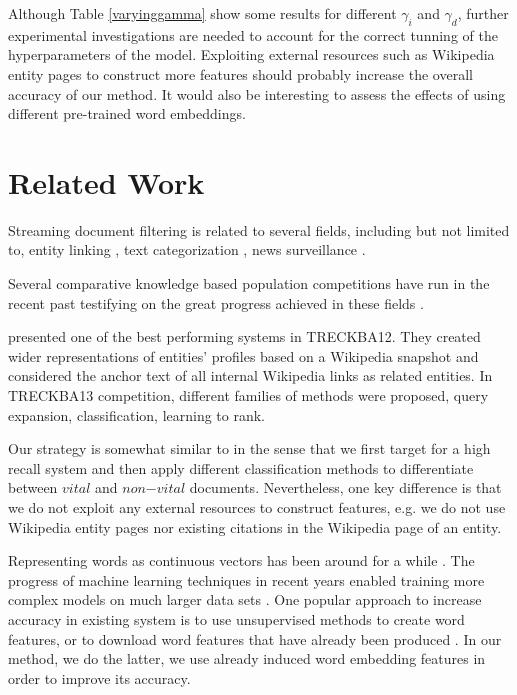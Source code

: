 \documentclass{article}
\begin{document}
Although Table \ref{varyinggamma} show some results for different $\gamma_i$ and $\gamma_d$, further experimental investigations are needed to account for the correct tunning of the hyperparameters of the model. Exploiting external resources such as Wikipedia entity pages to construct more features \cite{xitong12} should probably increase the overall accuracy of our method. It would also be interesting to assess the effects of using different pre-trained word embeddings.

\section{Related Work}
\label{related}

Streaming document filtering is related to several fields, including but not limited to, entity linking \cite{KBP11}, text categorization \cite{HLTCOE12}, news surveillance \cite{Steinberger14}.

Several comparative knowledge based population competitions have run in the recent past testifying on the great progress achieved in these fields \cite{gross_doucet_toivonen_trec12}. 

\citet{xitong12} presented one of the best performing systems in TRECKBA12. They created wider representations of entities' profiles based on a Wikipedia snapshot and considered the anchor text of all internal Wikipedia links as related entities. In TRECKBA13 competition, different families of methods were proposed, query expansion, classification, learning to rank. 

Our strategy is somewhat similar to \citet{jingang13} in the sense that we first target for a high recall system and then apply different classification methods to differentiate between $vital$ and $non\mathord{-}vital$ documents. Nevertheless, one key difference is that we do not exploit any external resources to construct features, e.g. we do not use Wikipedia entity pages nor existing citations in the Wikipedia page of an entity. 

Representing words as continuous vectors has been around for a while \cite{Hinton87, Elman90findingstructure}. The progress of machine learning techniques in recent years enabled training more complex models on much larger data sets \cite{mikolovChen}. One popular approach to increase accuracy in existing system is to use unsupervised methods to create word features, or to download word features that have already been produced \cite{Turian10wordrepresentations}. In our method, we do the latter, we use already induced word embedding features in order to improve its accuracy.
\end{document}
